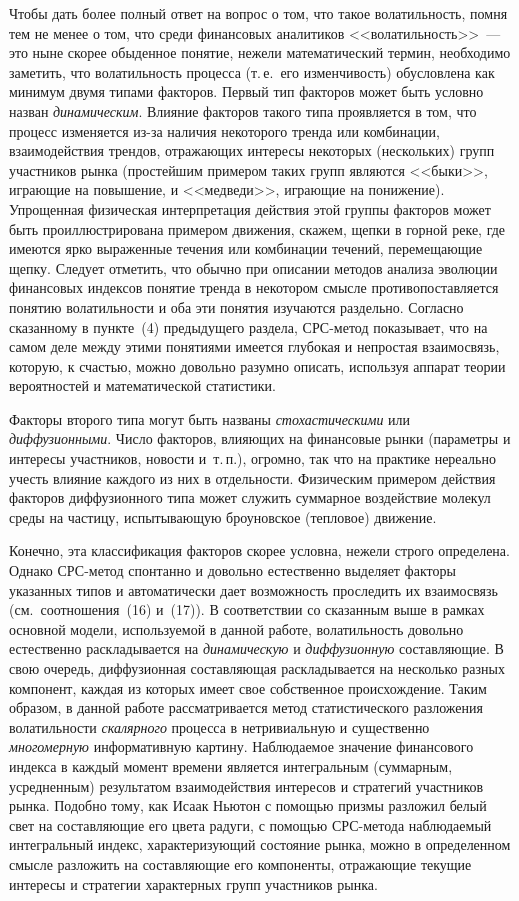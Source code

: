\begin{multicols}{2}
Чтобы дать более полный ответ на вопрос о том, что такое
волатильность, помня тем не менее о том, что среди финансовых
аналитиков <<волатильность>>~--- это ныне скорее обыденное понятие,
нежели математический термин, необходимо заметить, что
волатильность процесса (т.\,е.\ его изменчивость) обусловлена как
минимум двумя типами факторов. Первый тип факторов может быть
условно назван \textit{динамическим}. Влияние факторов такого типа
проявляется в том, что процесс изменяется из-за наличия некоторого
тренда или комбинации, взаимодействия трендов, отражающих интересы
некоторых (нескольких) групп участников рынка (простейшим примером
таких групп являются <<быки>>, играющие на повышение, и
<<медведи>>, играющие на понижение). Упрощенная физическая
интерпретация действия этой группы факторов может быть
проиллюстрирована примером движения, скажем, щепки в горной реке,
где имеются ярко выраженные течения или комбинации течений,
перемещающие щепку. Следует отметить, что обычно при описании
методов анализа эволюции финансовых индексов понятие тренда в
некотором смыс\-ле противопоставляется понятию во\-ла\-тиль\-ности и оба
эти понятия изучаются раздельно. Согласно сказанному в пункте~(4)
предыдущего раздела, СРС-метод показывает, что на самом деле между
этими понятиями имеется глубокая и непростая взаимосвязь, которую,
к счастью, можно довольно разумно описать, используя аппарат
теории вероятностей и математической статистики.

Факторы второго типа могут быть названы \textit{стохастическими}
или \textit{диффузионными}. Число факторов, влияющих на финансовые
рынки (параметры и интересы участников, новости и~т.\,п.), огромно,
так что на практике нереально учесть влияние каждого из них в
отдельности. Физическим примером действия факторов диффузионного
типа может служить суммарное воздействие молекул среды на частицу,
испытывающую броуновское (тепловое) движение.

Конечно, эта классификация факторов скорее условна, нежели строго
определена. Однако СРС-ме\-тод спонтанно и довольно естественно
выделяет факторы указанных типов и автоматически дает возможность
проследить их взаимосвязь (см.\ соотношения~(16) и~(17)). В
соответствии со сказанным выше в рамках основной модели,
используемой в данной работе, волатильность довольно естественно
раскладывается на \textit{динамическую} и \textit{диффузионную}
составляющие. В свою очередь, диффузионная составляющая
раскладывается на несколько разных компонент, каждая из которых
имеет свое собственное происхождение. Таким образом, в данной
работе рассматривается метод статистического разложения
волатильности \textit{скалярного} процесса в нетривиальную и
существенно \textit{многомерную} информативную картину.
Наблюдаемое значение финансового индекса в каждый момент времени
является интегральным (суммарным, усредненным) результатом
взаимодействия интересов и стратегий участников рынка. Подобно
тому, как Исаак Ньютон с помощью призмы разложил белый свет на
со\-став\-ля\-ющие его цвета радуги, с помощью СРС-метода наблюдаемый
интегральный индекс, характеризующий состояние рынка, можно в
определенном смысле разложить на составляющие его компоненты,
отражающие текущие интересы и стратегии характерных групп
участников рынка.


\end{multicols}
